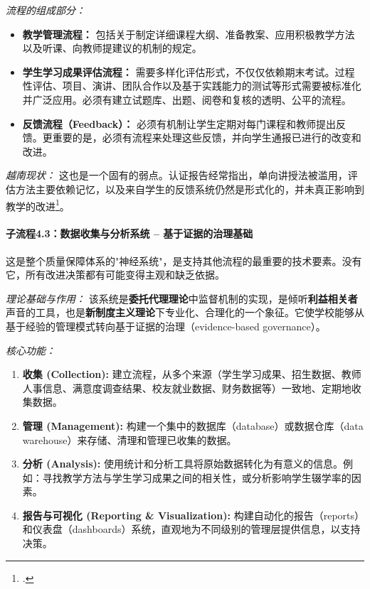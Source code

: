 \textit{流程的组成部分：}
\begin{itemize}
    \item \textbf{教学管理流程：} 包括关于制定详细课程大纲、准备教案、应用积极教学方法以及听课、向教师提建议的机制的规定。
    \item \textbf{学生学习成果评估流程：} 需要多样化评估形式，不仅仅依赖期末考试。过程性评估、项目、演讲、团队合作以及基于实践能力的测试等形式需要被标准化并广泛应用。必须有建立试题库、出题、阅卷和复核的透明、公平的流程。
    \item \textbf{反馈流程（Feedback）：} 必须有机制让学生定期对每门课程和教师提出反馈。更重要的是，必须有流程来处理这些反馈，并向学生通报已进行的改变和改进。
\end{itemize}

\textit{越南现状：} 这也是一个固有的弱点。认证报告经常指出，单向讲授法被滥用，评估方法主要依赖记忆，以及来自学生的反馈系统仍然是形式化的，并未真正影响到教学的改进\footcite{ExpertPerspectivesVN}。

\paragraph{子流程4.3：数据收集与分析系统 – 基于证据的治理基础}

这是整个质量保障体系的"神经系统"，是支持其他流程的最重要的技术要素。没有它，所有改进决策都有可能变得主观和缺乏依据。

\textit{理论基础与作用：} 该系统是\textbf{委托代理理论}中监督机制的实现，是倾听\textbf{利益相关者}声音的工具，也是\textbf{新制度主义理论}下专业化、合理化的一个象征。它使学校能够从基于经验的管理模式转向基于证据的治理（evidence-based governance）。

\textit{核心功能：}
\begin{enumerate}
    \item \textbf{收集 (Collection):} 建立流程，从多个来源（学生学习成果、招生数据、教师人事信息、满意度调查结果、校友就业数据、财务数据等）一致地、定期地收集数据。
    \item \textbf{管理 (Management):} 构建一个集中的数据库（database）或数据仓库（data warehouse）来存储、清理和管理已收集的数据。
    \item \textbf{分析 (Analysis):} 使用统计和分析工具将原始数据转化为有意义的信息。例如：寻找教学方法与学生学习成果之间的相关性，或分析影响学生辍学率的因素。
    \item \textbf{报告与可视化 (Reporting \& Visualization):} 构建自动化的报告（reports）和仪表盘（dashboards）系统，直观地为不同级别的管理层提供信息，以支持决策。
\end{enumerate}

